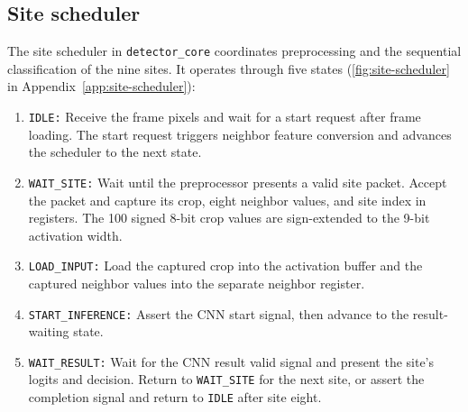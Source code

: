 \subsection{Site scheduler}
The site scheduler in \texttt{detector\_core} coordinates preprocessing and the sequential classification of the nine sites. It operates through five states (\cref{fig:site-scheduler} in Appendix~\ref{app:site-scheduler}):
\begin{enumerate}
    \item \texttt{IDLE:} Receive the frame pixels and wait for a start request after frame loading. The start request triggers neighbor feature conversion and advances the scheduler to the next state.
    \item \texttt{WAIT\_SITE:} Wait until the preprocessor presents a valid site packet. Accept the packet and capture its crop, eight neighbor values, and site index in registers. The 100 signed 8-bit crop values are sign-extended to the 9-bit activation width.
    \item \texttt{LOAD\_INPUT:} Load the captured crop into the activation buffer and the captured neighbor values into the separate neighbor register.
    \item \texttt{START\_INFERENCE:} Assert the CNN start signal, then advance to the result-waiting state.
    \item \texttt{WAIT\_RESULT:} Wait for the CNN result valid signal and present the site's logits and decision. Return to \texttt{WAIT\_SITE} for the next site, or assert the completion signal and return to \texttt{IDLE} after site eight.
\end{enumerate}


